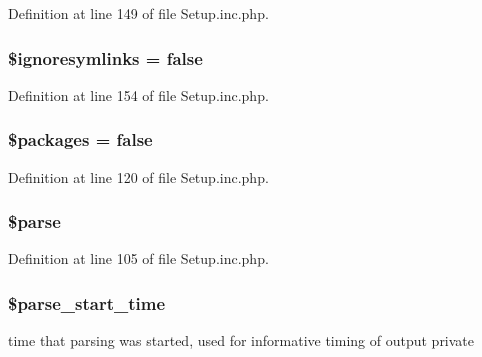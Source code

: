 \-Definition at line 149 of file \-Setup.\-inc.\-php.

\hypertarget{classphp_documentor__setup_ac3d405f8eed9ba79b53382deafcf2ce8}{
\subsubsection[{\$ignoresymlinks}]{\setlength{\rightskip}{0pt plus 5cm}\$ignoresymlinks = false}}\label{classphp_documentor__setup_ac3d405f8eed9ba79b53382deafcf2ce8}


\-Definition at line 154 of file \-Setup.\-inc.\-php.

\hypertarget{classphp_documentor__setup_a3140ce1c96c0b7043555f663eec9e23b}{
\subsubsection[{\$packages}]{\setlength{\rightskip}{0pt plus 5cm}\$packages = false}}\label{classphp_documentor__setup_a3140ce1c96c0b7043555f663eec9e23b}


\-Definition at line 120 of file \-Setup.\-inc.\-php.

\hypertarget{classphp_documentor__setup_afe6e95f01317311a80491b145e647d8b}{
\subsubsection[{\$parse}]{\setlength{\rightskip}{0pt plus 5cm}\$parse}}\label{classphp_documentor__setup_afe6e95f01317311a80491b145e647d8b}


\-Definition at line 105 of file \-Setup.\-inc.\-php.

\hypertarget{classphp_documentor__setup_aa508e51b1e1b788525c906e288cc89e9}{
\subsubsection[{\$parse\-\_\-start\-\_\-time}]{\setlength{\rightskip}{0pt plus 5cm}\$parse\-\_\-start\-\_\-time}}\label{classphp_documentor__setup_aa508e51b1e1b788525c906e288cc89e9}
time that parsing was started, used for informative timing of output  private 

